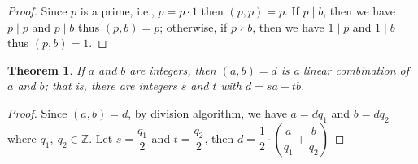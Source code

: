 \documentclass{article}
\newtheorem{theorem}{Theorem}[section]
\begin{document}
    \begin{proof}
        Since \(p\) is a prime, i.e., \(p=p \cdot 1 \) then \((p, p) = p\). If \(p \mid b\), 
        then we have \(p \mid p\) and \(p \mid b\) thus \((p, b)=p\); otherwise, if \(p \nmid b\), 
        then we have \(1 \mid p\) and \(1 \mid b\) thus \((p, b)=1\).
    \end{proof}
    \begin{theorem}
        If \(a\) and \(b\) are integers, then \((a, b)=d\) is a linear combination of \(a\)
        and \(b\); that is, there are integers \(s\) and \(t\) with \(d=sa+tb\).
    \end{theorem}
    \begin{proof}
        Since \((a,b)=d\), by division algorithm, we have \(a=dq_1\) and \(b=dq_2\) where 
        \(q_1,\ q_2 \in \mathbb{Z}\). Let \(s=\dfrac{q_1}{2}\) and \(t=\dfrac{q_2}{2}\), 
        then \(d=\dfrac{1}{2} \cdot (\dfrac{a}{q_1} + \dfrac{b}{q_2})\)
    \end{proof}
\end{document}
